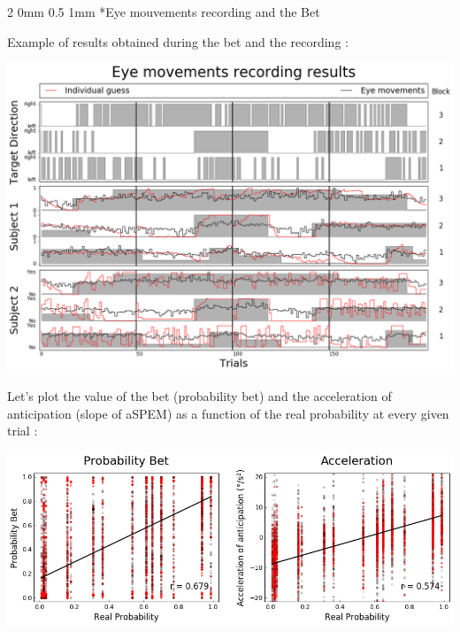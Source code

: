 \documentclass[profile,final,english, draft]{article}%
\makeatletter
\renewcommand{\subsection}{\@startsection
        {subsection}%
        {2}%
        {0mm}%
        {0.5\baselineskip}%
        {1mm}%
        {\normalsize\color[rgb]{0.4,0,0}\bfseries}}%
\makeatother
\begin{document}
\begin{multicols}{3}
\subsection*{Eye mouvements recording and the Bet}

Example of results obtained during the bet and the recording :

\begin{center}
    \includegraphics[width=1\columnwidth]{results_enregistrement}
\end{center}



Let's plot the value of the bet (probability bet)  and the acceleration of anticipation (slope of aSPEM) as a function of the real probability at every given trial :

\begin{center} 
    \includegraphics[width=1\columnwidth]{P_real}
\end{center}


\end{multicols}
\end{document}
